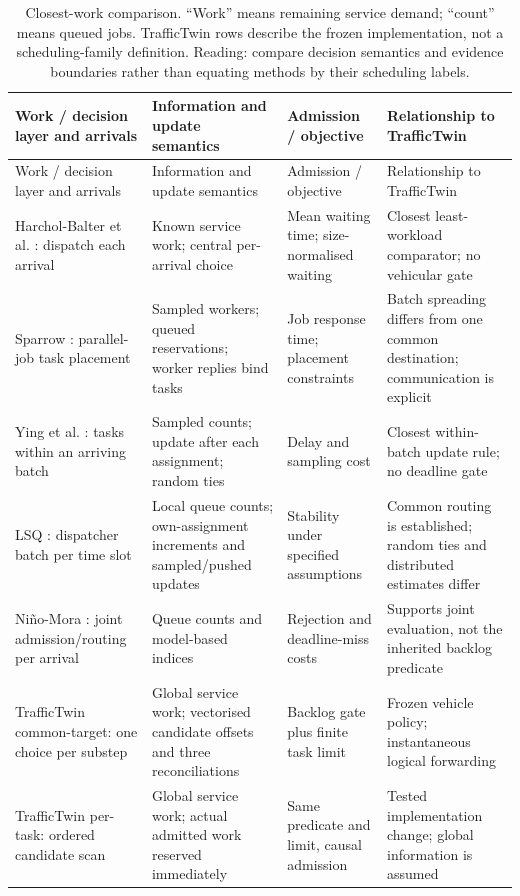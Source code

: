 \documentclass[12pt,a4paper]{article}
\begin{document}
\begingroup
\singlespacing\footnotesize\setlength{\tabcolsep}{3pt}
\renewcommand{\thetable}{1}
\begin{xltabular}{\textwidth}{@{}YYYY@{}}
\caption[Closest-work comparison]{Closest-work comparison. ``Work'' means remaining service demand; ``count'' means queued jobs. TrafficTwin rows describe the frozen implementation, not a scheduling-family definition. Reading: compare decision semantics and evidence boundaries rather than equating methods by their scheduling labels.}\label{tab:1} \\
\toprule
Work / decision layer and arrivals & Information and update semantics & Admission / objective & Relationship to TrafficTwin \\
\midrule\endfirsthead
\toprule
Work / decision layer and arrivals & Information and update semantics & Admission / objective & Relationship to TrafficTwin \\
\midrule\endhead
\bottomrule\endfoot
Harchol-Balter et al. \cite{ref14}: dispatch each arrival & Known service work; central per-arrival choice & Mean waiting time; size-normalised waiting & Closest least-workload comparator; no vehicular gate \\
Sparrow \cite{ref15}: parallel-job task placement & Sampled workers; queued reservations; worker replies bind tasks & Job response time; placement constraints & Batch spreading differs from one common destination; communication is explicit \\
Ying et al. \cite{ref16}: tasks within an arriving batch & Sampled counts; update after each assignment; random ties & Delay and sampling cost & Closest within-batch update rule; no deadline gate \\
LSQ \cite{ref18}: dispatcher batch per time slot & Local queue counts; own-assignment increments and sampled/pushed updates & Stability under specified assumptions & Common routing is established; random ties and distributed estimates differ \\
Niño-Mora \cite{ref20}: joint admission/routing per arrival & Queue counts and model-based indices & Rejection and deadline-miss costs & Supports joint evaluation, not the inherited backlog predicate \\
TrafficTwin common-target: one choice per substep & Global service work; vectorised candidate offsets and three reconciliations & Backlog gate plus finite task limit & Frozen vehicle policy; instantaneous logical forwarding \\
TrafficTwin per-task: ordered candidate scan & Global service work; actual admitted work reserved immediately & Same predicate and limit, causal admission & Tested implementation change; global information is assumed \\
\end{xltabular}
\endgroup
\end{document}

